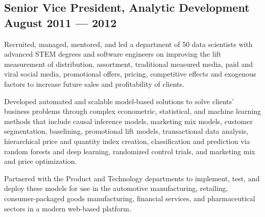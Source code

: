 \subsection{{Senior Vice President, Analytic Development  \hfill August 2011 --- 2012}}
\begin{zitemize}
\item  Recruited, managed, mentored, and led a department of 50 data scientists with advanced STEM degrees and software engineers on improving the lift measurement of distribution, assortment, traditional measured media, paid and viral social media, promotional offers, pricing, competitive effects and exogenous factors to increase future sales and profitability of clients.
\vspace{0.2em}
\item	Developed automated and scalable model-based solutions to solve clients’ business problems through complex econometric, statistical, and machine learning methods that include causal inference models, marketing mix models, customer segmentation, baselining, promotional lift models, transactional data analysis, hierarchical price and quantity index creation, classification and prediction via random forests and deep learning, randomized control trials, and marketing mix and price optimization.
\vspace{0.2em}
\item Partnered with the Product and Technology departments to implement, test, and deploy these models for use in the automotive manufacturing, retailing, consumer-packaged goods manufacturing, financial services, and pharmaceutical sectors in a modern web-based platform.

\end{zitemize}
